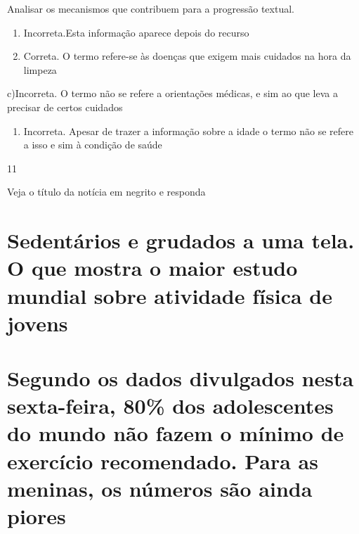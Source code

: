 {{\begin{escolha}
{\begin{itemize}
\begin{itemize}
Analisar os mecanismos que contribuem para a progressão textual.

\begin{enumerate}
\def\labelenumi{\arabic{enumi}.}
\item
  Incorreta.Esta informação aparece depois do recurso
\item
  Correta. O termo refere-se às doenças que exigem mais cuidados na hora
  da limpeza
\end{enumerate}

c)Incorreta. O termo não se refere a orientações médicas, e sim ao que
leva a precisar de certos cuidados

\begin{enumerate}
\def\labelenumi{\arabic{enumi}.}
\tightlist
\item
  Incorreta. Apesar de trazer a informação sobre a idade o termo não se
  refere a isso e sim à condição de saúde
\end{enumerate}

\num{11}

Veja o título da notícia em negrito e responda

\hypertarget{sedentuxe1rios-e-grudados-a-uma-tela.-o-que-mostra-o-maior-estudo-mundial-sobre-atividade-fuxedsica-de-jovens}{%
\section{\texorpdfstring{\textbf{Sedentários e grudados a uma tela. O
que mostra o maior estudo mundial sobre atividade física de
jovens}}{Sedentários e grudados a uma tela. O que mostra o maior estudo mundial sobre atividade física de jovens}}\label{sedentuxe1rios-e-grudados-a-uma-tela.-o-que-mostra-o-maior-estudo-mundial-sobre-atividade-fuxedsica-de-jovens}}

\hypertarget{segundo-os-dados-divulgados-nesta-sexta-feira-80-dos-adolescentes-do-mundo-nuxe3o-fazem-o-muxednimo-de-exercuxedcio-recomendado.-para-as-meninas-os-nuxfameros-suxe3o-ainda-piores}{%
\section{Segundo os dados divulgados nesta sexta-feira, 80\% dos
adolescentes do mundo não fazem o mínimo de exercício recomendado. Para
as meninas, os números são ainda
piores}\label{segundo-os-dados-divulgados-nesta-sexta-feira-80-dos-adolescentes-do-mundo-nuxe3o-fazem-o-muxednimo-de-exercuxedcio-recomendado.-para-as-meninas-os-nuxfameros-suxe3o-ainda-piores}}


\end{itemize}
\end{itemize}}
\end{escolha}}}
